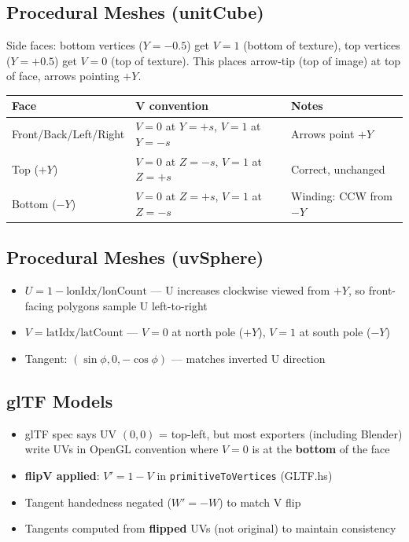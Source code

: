 \documentclass{article}
\begin{document}
\subsection{Procedural Meshes (unitCube)}
Side faces: bottom vertices ($Y = -0.5$) get $V = 1$ (bottom of texture), top vertices ($Y = +0.5$) get $V = 0$ (top of texture). This places arrow-tip (top of image) at top of face, arrows pointing $+Y$.

\begin{tabular}{lll}
\toprule
Face & V convention & Notes \\
\midrule
Front/Back/Left/Right & $V=0$ at $Y=+s$, $V=1$ at $Y=-s$ & Arrows point $+Y$ \\
Top ($+Y$) & $V=0$ at $Z=-s$, $V=1$ at $Z=+s$ & Correct, unchanged \\
Bottom ($-Y$) & $V=0$ at $Z=+s$, $V=1$ at $Z=-s$ & Winding: CCW from $-Y$ \\
\bottomrule
\end{tabular}

\subsection{Procedural Meshes (uvSphere)}
\begin{itemize}
\item $U = 1 - \text{lonIdx}/\text{lonCount}$ --- U increases clockwise viewed from $+Y$, so front-facing polygons sample U left-to-right
\item $V = \text{latIdx}/\text{latCount}$ --- $V=0$ at north pole ($+Y$), $V=1$ at south pole ($-Y$)
\item Tangent: $(\sin\phi, 0, -\cos\phi)$ --- matches inverted U direction
\end{itemize}

\subsection{glTF Models}
\begin{itemize}
\item glTF spec says UV $(0,0)$ = top-left, but most exporters (including Blender) write UVs in OpenGL convention where $V=0$ is at the \textbf{bottom} of the face
\item \textbf{flipV applied}: $V' = 1 - V$ in \texttt{primitiveToVertices} (GLTF.hs)
\item Tangent handedness negated ($W' = -W$) to match V flip
\item Tangents computed from \textbf{flipped} UVs (not original) to maintain consistency
\end{itemize}
\end{document}
